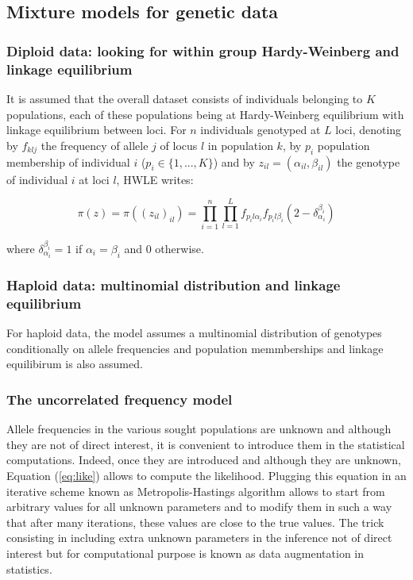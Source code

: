\documentclass[a4paper,10pt]{article}
\begin{document}
\subsection{Mixture models for genetic data}\label{sec:mixture}
\subsubsection{Diploid data: looking for within group Hardy-Weinberg and linkage equilibrium}

It is assumed that the overall dataset consists of individuals belonging to $K$ populations, 
each of these populations being 
at Hardy-Weinberg equilibrium with linkage equilibrium between loci. For $n$ individuals genotyped at $L$ loci, 
denoting by $f_{klj}$ the frequency of allele 
$j$ of locus $l$ in population $k$, by $p_i$ population membership of individual 
$i$ ($p_i  \in \{1,...,K\}$) and by 
$z_{il}=(\alpha_{il},\beta_{il})$ the genotype of individual $i$ at loci $l$, HWLE writes: 

\begin{equation}\label{eq:like}
\pi(z) = \pi((z_{il})_{il}) = \prod_{i=1}^n  \prod_{l=1}^L f_{p_il\alpha_i}f_{p_il\beta_i}(2-\delta_{\alpha_i}^{\beta_i})
\end{equation}

where $\delta_{\alpha_i}^{\beta_i}=1$ if $\alpha_i = \beta_i$  and  $0$ otherwise.


\subsubsection{Haploid data: multinomial distribution and linkage equilibrium}
For haploid data, the model assumes a multinomial distribution of genotypes conditionally 
on allele frequencies and population memmberships and linkage equilibirum is also assumed.

\subsubsection{The uncorrelated frequency model}

Allele frequencies in the various sought populations are unknown and although they are not of direct interest, 
it is convenient to introduce them in the statistical computations. Indeed, once they are introduced and although 
they are unknown, Equation (\ref{eq:like}) allows to compute the  likelihood. Plugging this equation in an iterative scheme known 
as  Metropolis-Hastings algorithm allows to start from arbitrary values for  
all unknown parameters and to modify them in such 
a way that after many iterations, these values are close to the true values. 
The trick consisting in including extra unknown parameters in the inference not of direct interest but for 
computational purpose is known as data augmentation in statistics. 
\end{document}
